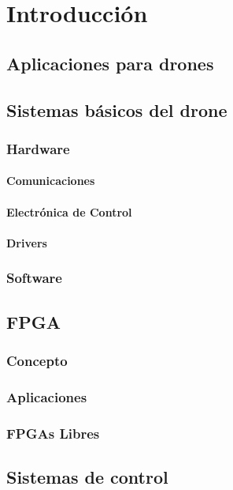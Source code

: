 \documentclass[10pt]{article}
\begin{document}



\tableofcontents


\hfill \break
\section{Introducción}
	\subsection{Aplicaciones para drones}
	\subsection{Sistemas básicos del drone}
		\subsubsection{Hardware}
			\paragraph{Comunicaciones}
			\paragraph{Electrónica de Control}
			\paragraph{Drivers}
		\subsubsection{Software}
	\subsection{FPGA}
		\subsubsection{Concepto}
		\subsubsection{Aplicaciones}
		\subsubsection{FPGAs Libres}
	\subsection{Sistemas de control}
\end{document}
